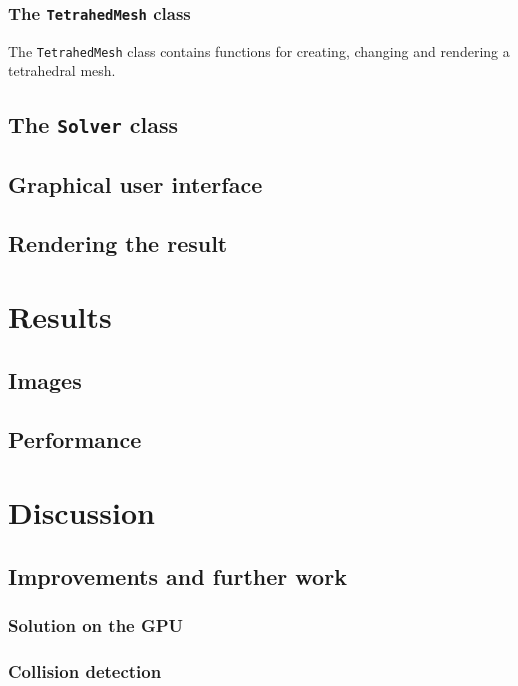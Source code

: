 \documentclass[10pt,a4paper]{article}
\begin{document}
\subsubsection{The \texttt{TetrahedMesh} class}
The \texttt{TetrahedMesh} class contains functions for creating, changing and rendering a tetrahedral mesh.

\subsection{The \texttt{Solver} class}



\subsection{Graphical user interface}

\subsection{Rendering the result}


\section{Results}
\subsection{Images}

\subsection{Performance}

\section{Discussion}
\subsection{Improvements and further work}
\subsubsection{Solution on the GPU}


\subsubsection{Collision detection}


\pagebreak
{}


\end{document}
